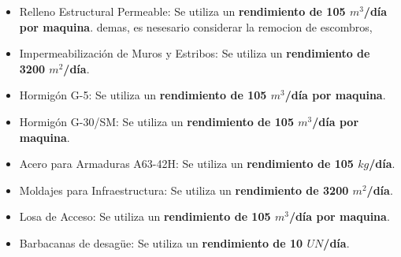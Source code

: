 \begin{itemize}
\begin{itemize}
        \item Relleno Estructural Permeable: Se utiliza un \textbf{rendimiento de 105 $m^3$/día por maquina}. demas, es nesesario considerar la remocion de escombros,
        \item Impermeabilización de Muros y Estribos: Se utiliza un \textbf{rendimiento de 3200 $m^2$/día}.
        \item Hormigón G-5: Se utiliza un \textbf{rendimiento de 105 $m^3$/día por maquina}.
        \item Hormigón G-30/SM: Se utiliza un \textbf{rendimiento de 105 $m^3$/día por maquina}.
        \item Acero para Armaduras A63-42H: Se utiliza un \textbf{rendimiento de 105 $kg$/día}.
        \item Moldajes para Infraestructura: Se utiliza un \textbf{rendimiento de 3200 $m^2$/día}.
        \item Losa de Acceso: Se utiliza un \textbf{rendimiento de 105 $m^3$/día por maquina}.
        \item Barbacanas de desagüe: Se utiliza un \textbf{rendimiento de 10 $UN$/día}.
    \end{itemize}
\end{itemize}